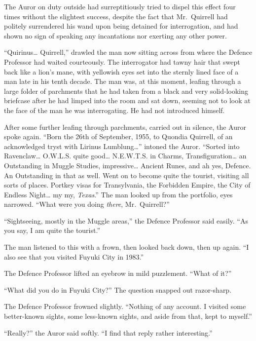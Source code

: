 The Auror on duty outside had surreptitiously tried to dispel this
effect four times without the slightest success, despite the fact that
Mr.~Quirrell had politely surrendered his wand upon being detained for
interrogation, and had shown no sign of speaking any incantations nor
exerting any other power.

``Quirinus\ldots{} Quirrell,'' drawled the man now sitting across from
where the Defence Professor had waited courteously. The interrogator had
tawny hair that swept back like a lion's mane, with yellowish eyes set
into the sternly lined face of a man late in his tenth decade. The man
was, at this moment, leafing through a large folder of parchments that
he had taken from a black and very solid-looking briefcase after he had
limped into the room and sat down, seeming not to look at the face of
the man he was interrogating. He had not introduced himself.

After some further leafing through parchments, carried out in silence,
the Auror spoke again. ``Born the 26th of September, 1955, to Quondia
Quirrell, of an acknowledged tryst with Lirinus Lumblung\ldots{}''
intoned the Auror. ``Sorted into Ravenclaw\ldots{} O.W.L.S. quite
good\ldots{} N.E.W.T.S. in Charms, Transfiguration\ldots{} an
Outstanding in Muggle Studies, impressive\ldots{} Ancient Runes, and ah
yes, Defence. An Outstanding in that as well. Went on to become quite
the tourist, visiting all sorts of places. Portkey visas for
Transylvania, the Forbidden Empire, the City of Endless Night\ldots{} my
my, \emph{Texas}.'' The man looked up from the portfolio, eyes narrowed.
``What were you doing \emph{there}, Mr.~Quirrell?''

``Sightseeing, mostly in the Muggle areas,'' the Defence Professor said
easily. ``As you say, I am quite the tourist.''

The man listened to this with a frown, then looked back down, then up
again. ``I also see that you visited Fuyuki City in 1983.''

The Defence Professor lifted an eyebrow in mild puzzlement. ``What of
it?''

``What did you do in Fuyuki City?'' The question snapped out
razor-sharp.

The Defence Professor frowned slightly. ``Nothing of any account. I
visited some better-known sights, some less-known sights, and aside from
that, kept to myself.''

``Really?'' the Auror said softly. ``I find that reply rather
interesting.''

